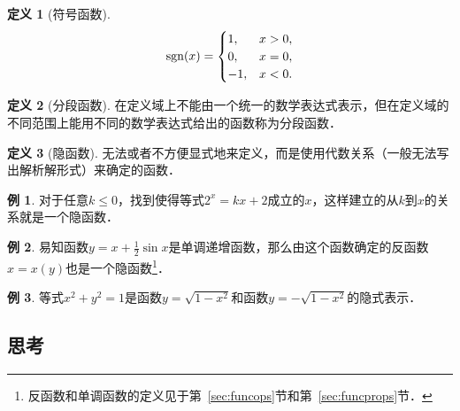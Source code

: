 \documentclass[a4paper,punct=CCT]{ctexbook}
\theoremstyle{definition}
\newtheorem*{definition*}{定义}
\newtheorem*{example*}{例}
\theoremstyle{remark}
\let\leq\leqslant
\let\le\leq
\begin{document}
\begin{definition*}[符号函数]
  \[
    \operatorname{sgn}(x) =
    \begin{cases}
      1, & x > 0, \\
      0, & x = 0, \\
      -1, & x < 0.
    \end{cases}
  \]
\end{definition*}

\begin{definition*}[分段函数]
  在定义域上不能由一个统一的数学表达式表示，但在定义域的不同范围上能用不同的数学表达式给出的函数称为分段函数．
\end{definition*}

\begin{definition*}[隐函数]
  无法或者不方便显式地来定义，而是使用代数关系（一般无法写出解析解形式）来确定的函数．
\end{definition*}

\begin{example*}
  对于任意\(k \le 0\)，找到使得等式\(2^x = kx + 2\)成立的\(x\)，这样建立的从\(k\)到\(x\)的关系就是一个隐函数．
\end{example*}

\begin{example*}
  易知函数\(y = x + \frac12 \sin x\)是单调递增函数，那么由这个函数确定的反函数\(x = x(y)\)也是一个隐函数\footnote{反函数和单调函数的定义见于第~\ref{sec:funcops}节和第~\ref{sec:funcprops}节．}．
\end{example*}

\begin{example*}
  等式\(x^2 + y^2 = 1\)是函数\(y = \sqrt{1 - x^2}\)和函数\(y = -\sqrt{1 - x^2}\)的隐式表示．
\end{example*}

\subsection*{思考}
\end{document}
